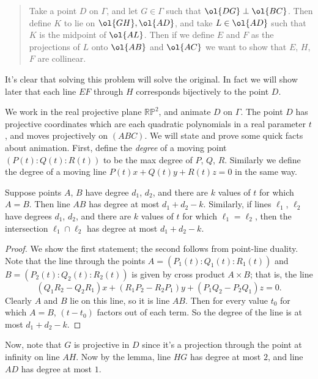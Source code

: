 \begin{quote}
Take a point $D$ on $\Gamma$,
and let $G\in \Gamma$ such that $\ol{DG} \perp \ol{BC}$.
Then define $K$ to lie on $\ol{GH}, \ol{AD}$,
and take $L \in \ol{AD}$ such that $K$ is the midpoint of $\ol{AL}$.
Then if we define $E$ and $F$ as the projections of $L$ onto $\ol{AB}$ and $\ol{AC}$
we want to show that $E$, $H$, $F$ are collinear.
\end{quote}

It's clear that solving this problem will solve the original.
In fact we will show later that each line $EF$ through $H$
corresponds bijectively to the point $D$.

We work in the real projective plane $\mathbb{RP}^2$,
and animate $D$ on $\Gamma$.
The point $D$ has projective coordinates
which are each quadratic polynomials in a real parameter $t$,
and moves projectively on $(ABC)$.
We will state and prove some quick facts about animation.
First, define the \emph{degree} of a moving point $(P(t):Q(t):R(t))$
to be the max degree of $P$, $Q$, $R$.
Similarly we define the degree
of a moving line $P(t)x+Q(t)y+R(t)z=0$ in the same way.

\begin{lemma*}
  Suppose points $A$, $B$ have degree $d_1$, $d_2$,
  and there are $k$ values of $t$ for which $A=B$.
  Then line $AB$ has degree at most $d_1+d_2-k$.
  Similarly, if lines $\ell_1$, $\ell_2$ have degrees $d_1$, $d_2$,
  and there are $k$ values of $t$ for which $\ell_1=\ell_2$,
  then the intersection $\ell_1 \cap \ell_2$ has degree at most $d_1+d_2-k$.
\end{lemma*}
\begin{proof}
  We show the first statement;
  the second follows from point-line duality.
  Note that the line through the points
  $A=(P_1(t):Q_1(t):R_1(t))$ and $B=(P_2(t):Q_2(t):R_2(t))$
  is given by cross product $A \times B$; that is, the line
  \[(Q_1 R_2-Q_2 R_1)x  + (R_1 P_2-R_2 P_1) y + (P_1 Q_2-P_2 Q_1)z = 0.\]
  Clearly $A$ and $B$ lie on this line, so it is line $AB$.
  Then for every value $t_0$ for which $A=B$,
  $(t-t_0)$ factors out of each term.
  So the degree of the line is at most $d_1+d_2-k$.
\end{proof}

Now, note that $G$ is projective in $D$
since it's a projection through the point at infinity on line $AH$.
Now by the lemma, line $HG$ has degree at most $2$,
and line $AD$ has degree at most $1$.

